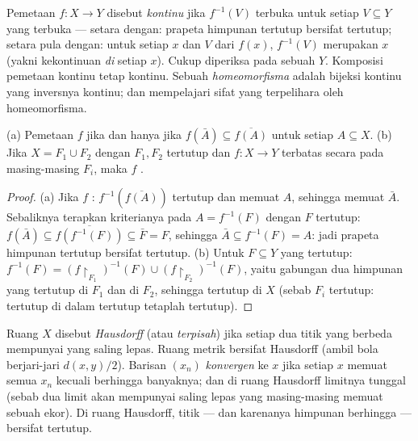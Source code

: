 \begin{definition}\label{def:b3:topology:continuity}
Pemetaan $f \colon X \to Y$ disebut \emph{kontinu} jika
$f^{-1}(V)$ terbuka untuk setiap $V \subseteq Y$ yang terbuka ---
setara dengan: prapeta himpunan tertutup bersifat tertutup; setara pula dengan:
untuk setiap $x$ dan  $V$ dari $f(x)$, $f^{-1}(V)$ merupakan
 $x$ (yakni kekontinuan \emph{di} setiap $x$). Cukup
diperiksa pada sebuah  $Y$. Komposisi pemetaan kontinu
tetap kontinu. Sebuah \emph{homeomorfisma}
adalah bijeksi kontinu yang inversnya kontinu; dan 
mempelajari sifat yang terpelihara oleh homeomorfisma.
\end{definition}

\begin{proposition}
\label{prop:b3:topology:gluing}
(a) Pemetaan $f$  jika dan hanya jika $f(\bar A) \subseteq \overline{f(A)}$
untuk setiap $A \subseteq X$.
(b) Jika $X = F_1 \cup F_2$ dengan $F_1, F_2$ tertutup dan $f\colon X
\to Y$ terbatas secara  pada masing-masing $F_i$, maka $f$
.
\end{proposition}

\begin{proof}
(a) Jika $f$ : $f^{-1}(\overline{f(A)})$ tertutup dan
memuat $A$, sehingga memuat $\bar A$. Sebaliknya terapkan
kriterianya pada $A = f^{-1}(F)$ dengan $F$ tertutup: $f(\bar A) \subseteq
\overline{f(f^{-1}(F))} \subseteq \bar F = F$, sehingga $\bar A
\subseteq f^{-1}(F) = A$: jadi prapeta himpunan tertutup bersifat tertutup.
(b) Untuk $F \subseteq Y$ yang tertutup: $f^{-1}(F) =
(f\restriction_{F_1})^{-1}(F) \cup (f\restriction_{F_2})^{-1}
(F)$, yaitu gabungan dua himpunan yang tertutup di $F_1$ dan di $F_2$, sehingga
tertutup di $X$ (sebab $F_i$ tertutup: tertutup di dalam tertutup tetaplah tertutup).
\end{proof}

\begin{definition}\label{def:b3:topology:hausdorff}
Ruang $X$ disebut \emph{Hausdorff} (atau
\emph{terpisah}) jika setiap dua titik yang berbeda mempunyai  yang
saling lepas. Ruang metrik bersifat Hausdorff (ambil bola berjari-jari
$d(x,y)/2$). Barisan $(x_n)$ \emph{konvergen} ke $x$ jika setiap
 $x$ memuat semua $x_n$ kecuali berhingga banyaknya; dan di ruang
Hausdorff limitnya tunggal (sebab dua limit akan mempunyai
 saling lepas yang masing-masing memuat sebuah ekor). Di ruang
Hausdorff, titik --- dan karenanya himpunan berhingga --- bersifat tertutup.
\end{definition}

